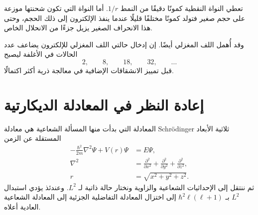 تعطي النواة النقطية كمونًا دقيقًا من النمط \(1/r\). أما النواة التي تكون شحنتها موزعة على حجم صغير فتولد كمونًا مختلفًا قليلًا عندما ينفذ الإلكترون إلى ذلك الحجم، وحتى هذا الانحراف الصغير يزيل جزءًا من الانحلال الخاص.

وقد أُهمل اللف المغزلي أيضًا. إن إدخال حالتي اللف المغزلي للإلكترون يضاعف عدد الحالات في الأغلفة ليصبح
\begin{equation}
2,\qquad 8,\qquad 18,\qquad 32,\qquad \ldots
\end{equation}
قبل تمييز الانشقاقات الإضافية في معالجة ذرية أكثر اكتمالًا.

\section{إعادة النظر في المعادلة الديكارتية}

المعادلة التي بدأت منها المسألة الشعاعية هي معادلة Schr\"odinger ثلاثية الأبعاد المستقلة عن الزمن
\begin{equation}
\begin{aligned}
-\frac{\hbar^2}{2m}\nabla^2\Psi+V(r)\Psi&=E\Psi,\\
\nabla^2&=\frac{\partial^2}{\partial x^2}
+\frac{\partial^2}{\partial y^2}
+\frac{\partial^2}{\partial z^2},\\
r&=\sqrt{x^2+y^2+z^2}.
\end{aligned}
\end{equation}
ثم ننتقل إلى الإحداثيات الشعاعية والزاوية ونختار حالة ذاتية لـ \(L^2\). وعندئذ يؤدي استبدال \(L^2\) بـ \(\hbar^2\ell(\ell+1)\) إلى اختزال المعادلة التفاضلية الجزئية إلى المعادلة الشعاعية العادية أعلاه.

\begin{classroomqa}
\end{classroomqa}

\begin{classroomqa}
\end{classroomqa}

